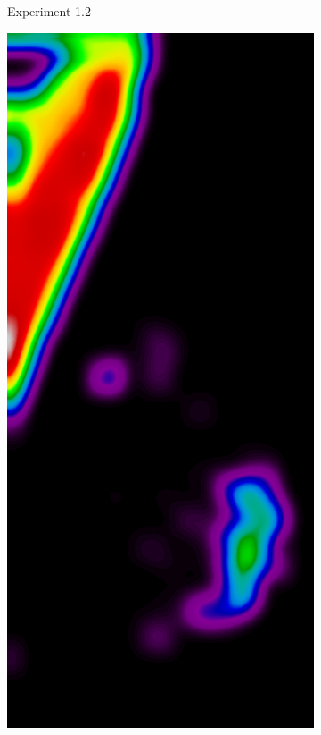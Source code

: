 \begin{figure}[h!]
\begin{subfigure}{0.195\textwidth}
		\caption{Experiment 1.2}
    \end{subfigure}
	\begin{subfigure}{0.195\textwidth}
		\centering
        	\includegraphics[width=\textwidth]{plots/examples/example5_probs_1_3.png}

\end{subfigure}
\end{figure}
